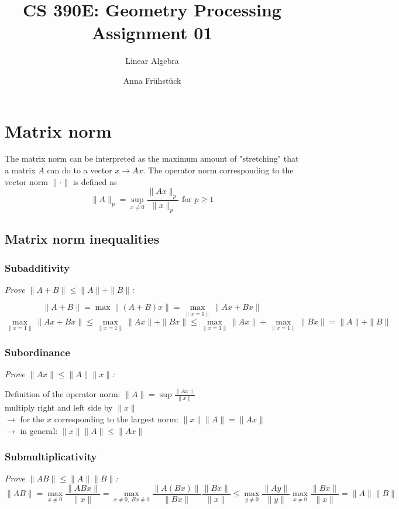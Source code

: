 \documentclass{scrartcl}
\title{CS 390E: Geometry Processing \\ Assignment 01} %
\subtitle{Linear Algebra}
\author{Anna Fr\"{u}hst\"{u}ck} %
\date{\displaydate{date}}
\begin{document}
\maketitle %


\section{Matrix norm}
The matrix norm can be interpreted as the maximum amount of "stretching" that a matrix $A$ can do to a vector $x \rightarrow Ax$. 
The operator norm corresponding to the vector norm $\|\cdot\|$ is defined as 
$$ \|A\|_p = \sup_{x\neq0}\frac{\|Ax\|_p}{\|x\|_p} \text{ for } p\geq1$$

\subsection{Matrix norm inequalities}
\subsubsection*{Subadditivity}
\textit{Prove $\|A+B\|\leq\|A\|+\|B\|$:}

$$\|A+B\| = \max\|(A+B)x\| = \max_{\|x=1\|}\|Ax + Bx\|$$
$$\max_{\|x=1\|}\|Ax + Bx\| \leq \max_{\|x=1\|}\|Ax\| + \|Bx\| \leq \max_{\|x=1\|}\|Ax\| + \max_{\|x=1\|}\|Bx\| = \|A\| + \|B\|$$

\subsubsection*{Subordinance}
\textit{Prove $\|Ax\|\leq\|A\|\|x\|$:}

Definition of the operator norm: $\|A\| = \sup\frac{\|Ax\|}{\|x\|}$\\
multiply right and left side by $\|x\|$\\
$\rightarrow$ for the $x$ corresponding to the largest norm: $\|x\|\|A\| = \|Ax\|$\\
$\rightarrow$ in general: $\|x\|\|A\| \leq \|Ax\|$

\subsubsection*{Submultiplicativity}
\textit{Prove $\|AB\|\leq\|A\|\|B\|$:}
$$\|AB\| = \max_{x\neq0}\frac{\|ABx\|}{\|x\|} = \max_{x\neq0,~Bx\neq0}\frac{\|A(Bx)\|}{\|Bx\|}\frac{\|Bx\|}{\|x\|} \leq \max_{y\neq0}\frac{\|Ay\|}{\|y\|}\max_{x\neq0}\frac{\|Bx\|}{\|x\|} = \|A\|\|B\|$$
\end{document}
